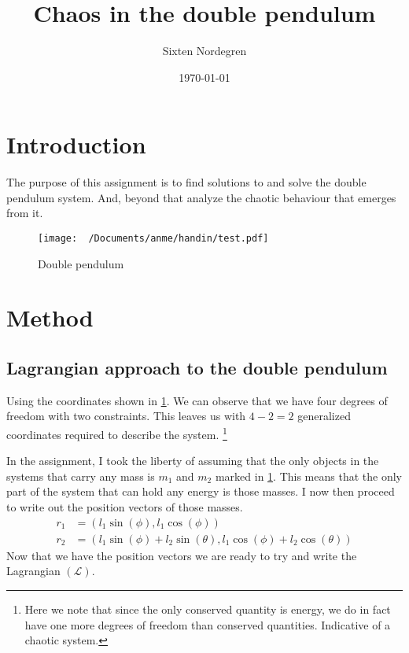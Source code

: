 \documentclass[twocolumn]{revtex4-2}
\newcommand{\Lagr}{\mathcal{L}}
\begin{document}
\date{\today}
\author{Sixten Nordegren}
\title{Chaos in the double pendulum}

\maketitle

\section{Introduction}
The purpose of this assignment is to find solutions to and solve the double pendulum system. And, beyond that analyze the chaotic behaviour that emerges from it. 
\begin{figure}[b]
	\texttt{[image: ~/Documents/anme/handin/test.pdf]}
	\caption{Double pendulum \label{fig: doubble pendulum}}
\end{figure}
\section{Method}
\subsection{Lagrangian approach to the double pendulum}
Using the coordinates shown in \ref{fig: doubble pendulum}. We can observe that we have four degrees of freedom with two constraints. This leaves us with $4 - 2  = 2$ generalized coordinates required to describe the system. \footnote{Here we note that since the only conserved quantity is energy, we do in fact have one more degrees of freedom than conserved quantities. Indicative of a chaotic system.}

In the assignment, I took the liberty of assuming that the only objects in the systems that carry any mass is $m_1$ and $m_2$ marked in \ref{fig: doubble pendulum}. This means that the only part of the system that can hold any energy is those masses. I now then proceed to write out the position vectors of those masses.
\begin{align*}
	r_1 &= (l_1 \sin{(\phi)}, l_1 \cos{(\phi)}) \\
	r_2 &= (l_1 \sin{(\phi)} + l_2 \sin{(\theta)}, l_1 \cos{(\phi)} + l_2\cos{(\theta)})
\end{align*}
Now that we have the position vectors we are ready to try and write the Lagrangian $(\Lagr)$.
\end{document}
